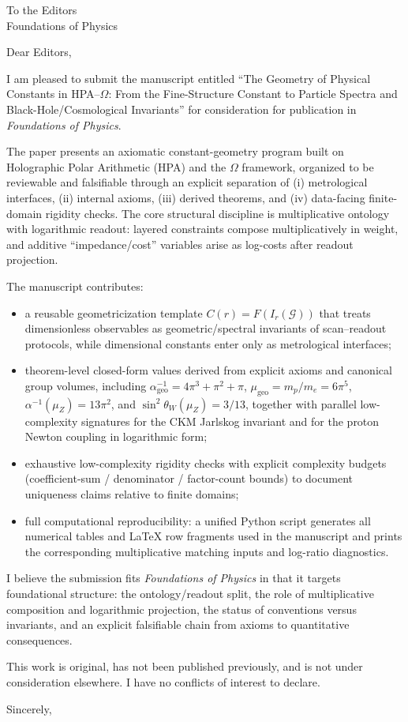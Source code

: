 \documentclass[11pt,a4paper]{letter}
\date{\today}
\begin{document}
\begin{letter}{To the Editors\\Foundations of Physics}

\opening{Dear Editors,}

I am pleased to submit the manuscript entitled
``The Geometry of Physical Constants in HPA--$\Omega$: From the Fine-Structure Constant to Particle Spectra and Black-Hole/Cosmological Invariants''
for consideration for publication in \emph{Foundations of Physics}.

The paper presents an axiomatic constant-geometry program built on Holographic Polar Arithmetic (HPA) and the $\Omega$ framework, organized to be reviewable and falsifiable through an explicit separation of (i) metrological interfaces, (ii) internal axioms, (iii) derived theorems, and (iv) data-facing finite-domain rigidity checks. The core structural discipline is multiplicative ontology with logarithmic readout: layered constraints compose multiplicatively in weight, and additive ``impedance/cost'' variables arise as log-costs after readout projection.

The manuscript contributes:
\begin{itemize}
  \item a reusable geometricization template \(C(r)=F(I_r(\mathcal{G}))\) that treats dimensionless observables as geometric/spectral invariants of scan--readout protocols, while dimensional constants enter only as metrological interfaces;
  \item theorem-level closed-form values derived from explicit axioms and canonical group volumes, including
  \(\alpha_{\mathrm{geo}}^{-1}=4\pi^3+\pi^2+\pi\),
  \(\mu_{\mathrm{geo}}=m_p/m_e=6\pi^5\),
  \(\alpha^{-1}(\mu_Z)=13\pi^2\),
  and \(\sin^2\theta_W(\mu_Z)=3/13\), together with parallel low-complexity signatures for the CKM Jarlskog invariant and for the proton Newton coupling in logarithmic form;
  \item exhaustive low-complexity rigidity checks with explicit complexity budgets (coefficient-sum / denominator / factor-count bounds) to document uniqueness claims relative to finite domains;
  \item full computational reproducibility: a unified Python script generates all numerical tables and LaTeX row fragments used in the manuscript and prints the corresponding multiplicative matching inputs and log-ratio diagnostics.
\end{itemize}

I believe the submission fits \emph{Foundations of Physics} in that it targets foundational structure: the ontology/readout split, the role of multiplicative composition and logarithmic projection, the status of conventions versus invariants, and an explicit falsifiable chain from axioms to quantitative consequences.

This work is original, has not been published previously, and is not under consideration elsewhere. I have no conflicts of interest to declare.

\closing{Sincerely,}

\end{letter}
\end{document}

